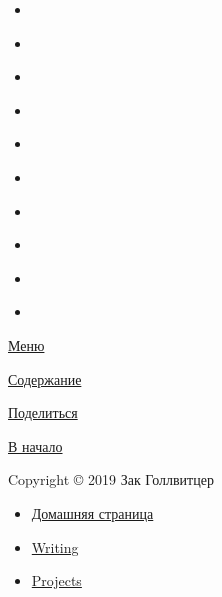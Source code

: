 \documentclass{report}
\begin{document}
\hypertarget{share-footer}{}
\begin{itemize}
\tightlist
\item
  \href{http://www.facebook.com/sharer.php?u=blog/2019/bash-essentials/}{\emph{}}
\item
  \href{https://twitter.com/share?url=blog/2019/bash-essentials/\&text=Bash\%20Essentials}{\emph{}}
\item
  \href{http://www.linkedin.com/shareArticle?url=blog/2019/bash-essentials/\&title=Bash\%20Essentials}{\emph{}}
\item
  \href{https://pinterest.com/pin/create/bookmarklet/?url=blog/2019/bash-essentials/\&is_video=false\&description=Bash\%20Essentials}{\emph{}}
\item
  \href{mailto:?subject=Bash\%20Essentials\&body=Check\%20out\%20this\%20article:\%20blog/2019/bash-essentials/}{\emph{}}
\item
  \href{https://getpocket.com/save?url=blog/2019/bash-essentials/\&title=Bash\%20Essentials}{\emph{}}
\item
  \href{http://reddit.com/submit?url=blog/2019/bash-essentials/\&title=Bash\%20Essentials}{\emph{}}
\item
  \href{http://www.stumbleupon.com/submit?url=blog/2019/bash-essentials/\&title=Bash\%20Essentials}{\emph{}}
\item
  \href{http://digg.com/submit?url=blog/2019/bash-essentials/\&title=Bash\%20Essentials}{\emph{}}
\item
  \href{http://www.tumblr.com/share/link?url=blog/2019/bash-essentials/\&name=Bash\%20Essentials\&description=}{\emph{}}
\end{itemize}

\hypertarget{actions-footer}{}
\protect\hypertarget{menu}{\protect\hyperlink{}{\emph{} Меню}}
\protect\hypertarget{toc}{\protect\hyperlink{}{\emph{} Содержание}}
\protect\hypertarget{share}{\protect\hyperlink{}{\emph{} Поделиться}}
\protect\hypertarget{top}{\protect\hyperlink{}{\emph{} В начало}}

Copyright © 2019 Зак Голлвитцер

\begin{itemize}
\tightlist
\item
  \href{http://zachgoll.github.io}{Домашняя страница}
\item
  \href{blog/archives/}{Writing}
\item
  \href{portfolio}{Projects}
\end{itemize}
\end{document}
